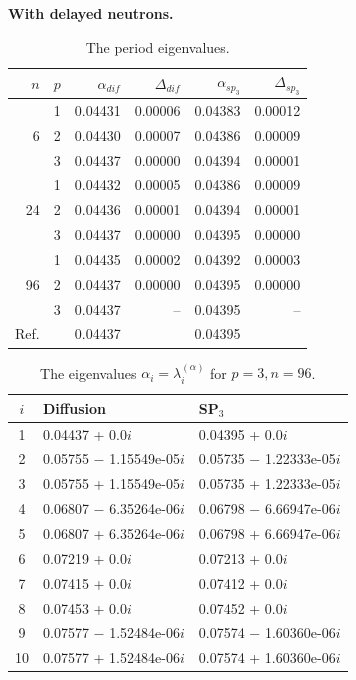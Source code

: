 \documentclass[authoryear]{elsarticle}
\begin{document}
\textbf{With delayed neutrons.}

\begin{table}[h]
\caption{The period eigenvalues.}
\label{tab:hwr_alpha_del}
\begin{center}
\begin{tabular}{rrrrrr}
\hline
$n$ & $p$ & $\alpha_{dif}$ & $\Delta_{dif}$ &$\alpha_{sp_3}$& $\Delta_{sp_3}$ \\
\hline
	& 1	&0.04431 & 0.00006 & 0.04383 & 0.00012\\
6	& 2	&0.04430 & 0.00007 & 0.04386 & 0.00009\\
	& 3	&0.04437 & 0.00000 & 0.04394 & 0.00001\\ 
\hline
	& 1	&0.04432 & 0.00005 & 0.04386 & 0.00009\\
24& 2	&0.04436 & 0.00001 & 0.04394 & 0.00001\\
	& 3	&0.04437 & 0.00000 & 0.04395 & 0.00000\\ 
\hline
	& 1	&0.04435 & 0.00002 & 0.04392 & 0.00003\\
96& 2	&0.04437 & 0.00000 & 0.04395 & 0.00000\\
	& 3	&0.04437 & --      & 0.04395 & -- \\ 
\hline
Ref.& & 0.04437 & & 0.04395 \\ 
\hline
\end{tabular}
\end{center}
\end{table}

\begin{table}[h]
\caption{The eigenvalues $\alpha_i=\lambda_i^{(\alpha)}$ for $p=3, n=96$.}
\label{tab:hwr_alpha_del_10}
\begin{center}
\begin{tabular}{c l l}
\hline
$i$ & Diffusion & SP$_3$ \\
\hline
1 &0.04437 + 0.0$i$     		&0.04395 + 0.0$i$ \\
2 &0.05755 $-$ 1.15549e-05$i$ 	&0.05735 $-$ 1.22333e-05$i$ \\
3 &0.05755 + 1.15549e-05$i$   	&0.05735 + 1.22333e-05$i$ \\
4 &0.06807 $-$ 6.35264e-06$i$   &0.06798 $-$ 6.66947e-06$i$ \\
5 &0.06807 + 6.35264e-06$i$     &0.06798 + 6.66947e-06$i$ \\
6 &0.07219 + 0.0$i$             &0.07213 + 0.0$i$ \\
7 &0.07415 + 0.0$i$             &0.07412 + 0.0$i$ \\
8 &0.07453 + 0.0$i$          	&0.07452 + 0.0$i$ \\
9 &0.07577 $-$ 1.52484e-06$i$   &0.07574 $-$ 1.60360e-06$i$ \\
10&0.07577 + 1.52484e-06$i$     &0.07574 + 1.60360e-06$i$ \\
\hline
\end{tabular}
\end{center}
\end{table}
\end{document}

